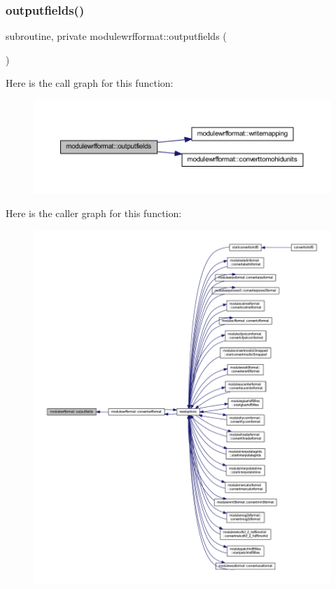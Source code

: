 \subsubsection{\texorpdfstring{outputfields()}{outputfields()}}
{\footnotesize\ttfamily subroutine, private modulewrfformat\+::outputfields (\begin{DoxyParamCaption}{ }\end{DoxyParamCaption})\hspace{0.3cm}{\ttfamily [private]}}

Here is the call graph for this function\+:\nopagebreak
\begin{figure}[H]
\begin{center}
\leavevmode
\includegraphics[width=350pt]{namespacemodulewrfformat_acba548a01d7e2ba1276dc6da267132ff_cgraph}
\end{center}
\end{figure}
Here is the caller graph for this function\+:\nopagebreak
\begin{figure}[H]
\begin{center}
\leavevmode
\includegraphics[width=350pt]{namespacemodulewrfformat_acba548a01d7e2ba1276dc6da267132ff_icgraph}
\end{center}
\end{figure}
\mbox{\label{namespacemodulewrfformat_a6acfc9c1ce2d45f5a0a6187e1e8083f8}} 
